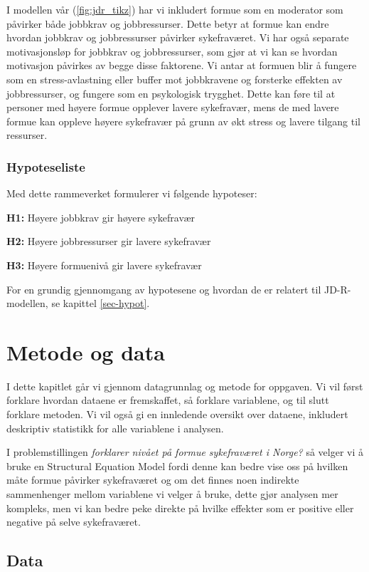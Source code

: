 \documentclass[
  12pt,
  a4paper,
  DIV=11,
  numbers=noendperiod]{scrartcl}
\begin{document}
I modellen vår (\autoref{fig:jdr_tikz}) har vi inkludert formue som en
moderator som påvirker både jobbkrav og jobbressurser. Dette betyr at
formue kan endre hvordan jobbkrav og jobbressurser påvirker
sykefraværet. Vi har også separate motivasjonsløp for jobbkrav og
jobbressurser, som gjør at vi kan se hvordan motivasjon påvirkes av
begge disse faktorene. Vi antar at formuen blir å fungere som en
stress-avlastning eller buffer mot jobbkravene og forsterke effekten av
jobbressurser, og fungere som en psykologisk trygghet. Dette kan føre
til at personer med høyere formue opplever lavere sykefravær, mens de
med lavere formue kan oppleve høyere sykefravær på grunn av økt stress
og lavere tilgang til ressurser.

\subsubsection{Hypoteseliste}\label{hypoteseliste}

Med dette rammeverket formulerer vi følgende hypoteser:

\textbf{H1:} Høyere jobbkrav gir høyere sykefravær

\textbf{H2:} Høyere jobbressurser gir lavere sykefravær

\textbf{H3:} Høyere formuenivå gir lavere sykefravær

For en grundig gjennomgang av hypotesene og hvordan de er relatert til
JD-R-modellen, se kapittel \ref{sec-hypot}.

\section{Metode og data}\label{metode-og-data}

I dette kapitlet går vi gjennom datagrunnlag og metode for oppgaven. Vi
vil først forklare hvordan dataene er fremskaffet, så forklare
variablene, og til slutt forklare metoden. Vi vil også gi en innledende
oversikt over dataene, inkludert deskriptiv statistikk for alle
variablene i analysen.

I problemstillingen \emph{forklarer nivået på formue sykefraværet i
Norge?} så velger vi å bruke en Structural Equation Model fordi denne
kan bedre vise oss på hvilken måte formue påvirker sykefraværet og om
det finnes noen indirekte sammenhenger mellom variablene vi velger å
bruke, dette gjør analysen mer kompleks, men vi kan bedre peke direkte
på hvilke effekter som er positive eller negative på selve sykefraværet.

\subsection{Data}\label{data}
\end{document}
